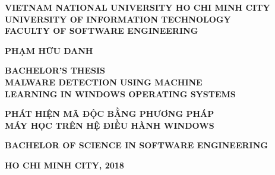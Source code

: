 %
\begin{titlepage}


\thisfancypage{
\setlength{\fboxsep}{15pt}
\doublebox
}{}


\begin{center}
  
\textbf{\large VIETNAM NATIONAL UNIVERSITY HO CHI MINH CITY} \\[2mm]
\textbf{\Large UNIVERSITY OF INFORMATION TECHNOLOGY} \\ [2mm]
\textbf{\Large FACULTY OF SOFTWARE ENGINEERING}

\vspace{0.1\textheight}
\begin{otherlanguage}{vietnamese}
\textbf{\large PHẠM HỮU DANH}
\end{otherlanguage}

\vspace{0.1\textheight}
\textbf{\Large BACHELOR’S THESIS} \\ [10mm]

\textbf{\Large MALWARE DETECTION USING MACHINE } \\ [2mm]
\textbf{\Large LEARNING IN WINDOWS OPERATING SYSTEMS } \\ [10mm]

\begin{otherlanguage}{vietnamese}
\textbf{ \Large PHÁT HIỆN MÃ ĐỘC BẰNG PHƯƠNG PHÁP } \\ [2mm]
\textbf{ \Large MÁY HỌC TRÊN HỆ ĐIỀU HÀNH WINDOWS }
\end{otherlanguage}

\vspace{0.15\textheight}

\textbf{\large BACHELOR OF SCIENCE IN SOFTWARE ENGINEERING}

\vspace{\fill}
\textbf{\large HO CHI MINH CITY, 2018}
\end{center}

\end{titlepage}
\cleardoublepage

